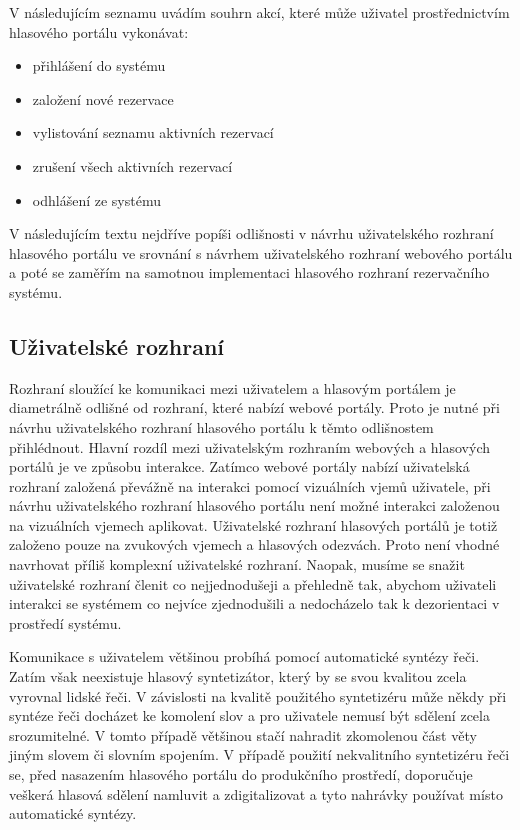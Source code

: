 \documentclass[ing,male,java,dept460]{diploma}						%
\begin{document}
V následujícím seznamu uvádím souhrn akcí, které může uživatel prostřednictvím hlasového portálu vykonávat:

\begin{itemize}
\item přihlášení do systému
\item založení nové rezervace
\item vylistování seznamu aktivních rezervací
\item zrušení všech aktivních rezervací
\item odhlášení ze systému
\end{itemize}

V následujícím textu nejdříve popíši odlišnosti v návrhu uživatelského rozhraní hlasového portálu ve srovnání s návrhem uživatelského rozhraní webového portálu a poté se zaměřím na samotnou implementaci hlasového rozhraní rezervačního systému.

\subsection{Uživatelské rozhraní}
Rozhraní sloužící ke komunikaci mezi uživatelem a hlasovým portálem je diametrálně odlišné od rozhraní, které nabízí webové portály. Proto je nutné při návrhu uživatelského rozhraní hlasového portálu k těmto odlišnostem přihlédnout. Hlavní rozdíl mezi uživatelským rozhraním webových a hlasových portálů je ve způsobu interakce. Zatímco webové portály nabízí uživatelská rozhraní založená převážně na interakci pomocí vizuálních vjemů uživatele, při návrhu uživatelského rozhraní hlasového portálu není možné interakci založenou na vizuálních vjemech aplikovat. Uživatelské rozhraní hlasových portálů je totiž založeno pouze na zvukových vjemech a hlasových odezvách. Proto není vhodné navrhovat příliš komplexní uživatelské rozhraní. Naopak, musíme se snažit uživatelské rozhraní členit co nejjednodušeji a přehledně tak, abychom uživateli interakci se systémem co nejvíce zjednodušili a nedocházelo tak k dezorientaci v prostředí systému.

Komunikace s uživatelem většinou probíhá pomocí automatické syntézy řeči. Zatím však neexistuje hlasový syntetizátor, který by se svou kvalitou zcela vyrovnal lidské řeči. V závislosti na kvalitě použitého syntetizéru může někdy při syntéze řeči docházet ke komolení slov a pro uživatele nemusí být sdělení zcela srozumitelné. V tomto případě většinou stačí nahradit zkomolenou část věty jiným slovem či slovním spojením. V případě použití nekvalitního syntetizéru řeči se, před nasazením hlasového portálu do produkčního prostředí, doporučuje veškerá hlasová sdělení namluvit a zdigitalizovat a tyto nahrávky používat místo automatické syntézy.
\end{document}
